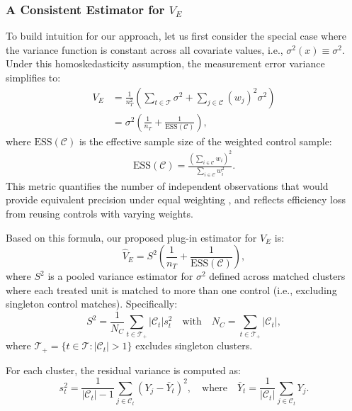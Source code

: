 \documentclass{mytemplate}
\begin{document}
\subsubsection{A Consistent Estimator for $V_E$}
To build intuition for our approach, let us first consider the special case where the variance function is constant across all covariate values, i.e., $\sigma^2(x) \equiv \sigma^2$. Under this homoskedasticity assumption, the measurement error variance simplifies to:
\begin{equation}
\begin{split}
    V_E &= \frac{1}{n_T^2}\left(\sum_{t \in \mathcal{T}} \sigma^2 + \sum_{j \in \mathcal{C}}\left(w_j\right)^2 \sigma^2\right)\\
    &= \sigma^2 \left( \frac{1}{n_T} + \frac{1}{\text{ESS}(\mathcal{C})} \right),
\end{split}
\end{equation}
where $\text{ESS}(\mathcal{C})$ is the effective sample size of the weighted control sample:
\begin{align}
    \text{ESS}(\mathcal{C}) = \frac{(\sum_{i \in \mathcal{C}} w_i)^2}{\sum_{i \in \mathcal{C}} w_i^2}. \label{eq:ESS}
\end{align}
This metric quantifies the number of independent observations that would provide equivalent precision under equal weighting \citep{potthoff_equivalent_2024}, and reflects efficiency loss from reusing controls with varying weights.

Based on this formula, our proposed plug-in estimator for $V_E$ is:
\begin{equation}
\label{eq:plug-in-estimator}
   \hat{V}_E = S^2 \left( \frac{1}{n_T} + \frac{1}{\text{ESS}(\mathcal{C})} \right),
\end{equation}
where $S^2$ is a pooled variance estimator for $\sigma^2$ defined across matched clusters where each treated unit is matched to more than one control (i.e., excluding singleton control matches). Specifically:
\begin{equation}
\label{eq:S^2}
S^2 = \frac{1}{N_C} \sum_{t \in \mathcal{T}_+} |\mathcal{C}_t| s^2_t \quad \text{with} \quad N_C = \sum_{t \in \mathcal{T}_+} |\mathcal{C}_t|,
\end{equation}
where $\mathcal{T}_+ = \{t \in \mathcal{T} : |\mathcal{C}_t| > 1\}$ excludes singleton clusters.

For each cluster, the residual variance is computed as:
\begin{equation}
\label{eq:s^2_t}
s^2_t = \frac{1}{|\mathcal{C}_t| - 1} \sum_{j \in \mathcal{C}_t} \left(Y_{j} - \bar{Y}_t\right)^2, \quad \text{where} \quad \bar{Y}_t = \frac{1}{|\mathcal{C}_t|} \sum_{j \in \mathcal{C}_t} Y_{j}.
\end{equation}
\end{document}
